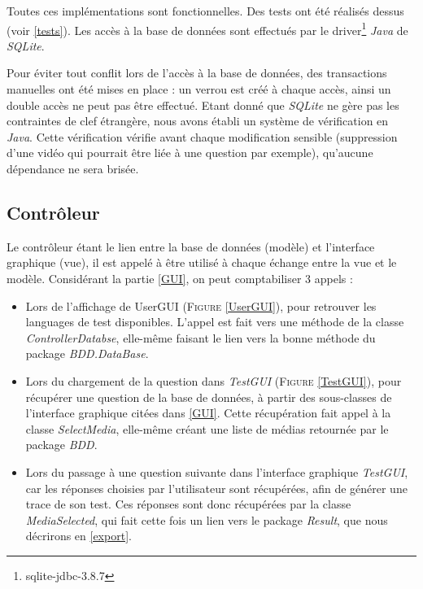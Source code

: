 Toutes ces implémentations sont fonctionnelles. Des tests ont été réalisés dessus (voir \ref{tests}).
Les accès à la base de données sont effectués par le driver\footnote{sqlite-jdbc-3.8.7} \textit{Java} de \textit{SQLite}.

Pour éviter tout conflit lors de l'accès à la base de données, des transactions manuelles ont été mises en place : un verrou est créé à chaque accès, ainsi un double accès ne peut pas être effectué.
Etant donné que \textit{SQLite} ne gère pas les contraintes de clef étrangère, nous avons établi un système de vérification en \textit{Java}. Cette vérification vérifie avant chaque modification sensible (suppression d'une vidéo qui pourrait être liée à une question par exemple), qu'aucune dépendance ne sera brisée.


\subsection{Contrôleur}\label{controller}


Le contrôleur étant le lien entre la base de données (modèle) et l'interface graphique (vue), il est appelé à être utilisé à chaque échange entre la vue et le modèle.
Considérant la partie \ref{GUI}, on peut comptabiliser 3 appels :

\begin{itemize}
 \item Lors de l'affichage de UserGUI (\textsc{Figure} \ref{UserGUI}), pour retrouver les languages de test disponibles. L'appel est fait vers une méthode de la classe \textit{ControllerDatabse}, elle-même faisant le lien vers la bonne méthode du package \textit{BDD.DataBase}.
 \item Lors du chargement de la question dans \textit{TestGUI} (\textsc{Figure} \ref{TestGUI}), pour récupérer une question de la base de données, à partir des sous-classes de l'interface graphique citées dans \ref{GUI}. Cette récupération fait appel à la classe \textit{SelectMedia}, elle-même créant une liste de médias retournée par le package \textit{BDD}.
 \item Lors du passage à une question suivante dans l'interface graphique \textit{TestGUI}, car les réponses choisies par l'utilisateur sont récupérées, afin de générer une trace de son test. Ces réponses sont donc récupérées par la classe \textit{MediaSelected}, qui fait cette fois un lien vers le package \textit{Result}, que nous décrirons en \ref{export}.
\end{itemize}


